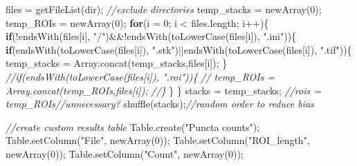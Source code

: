 \documentclass[
  12pt,
  a4paper,
]{book}
\newenvironment{Shaded}{}{}
\newcommand{\CommentTok}[1]{\textcolor[rgb]{0.38,0.63,0.69}{\textit{#1}}}
\newcommand{\ControlFlowTok}[1]{\textcolor[rgb]{0.00,0.44,0.13}{\textbf{#1}}}
\newcommand{\DecValTok}[1]{\textcolor[rgb]{0.25,0.63,0.44}{#1}}
\newcommand{\NormalTok}[1]{#1}
\newcommand{\OperatorTok}[1]{\textcolor[rgb]{0.40,0.40,0.40}{#1}}
\newcommand{\StringTok}[1]{\textcolor[rgb]{0.25,0.44,0.63}{#1}}
\begin{document}
\begin{Shaded}
\begin{Highlighting}[]
\NormalTok{files }\OperatorTok{=}\NormalTok{ getFileList}\OperatorTok{(}\NormalTok{dir}\OperatorTok{);}
\CommentTok{//exclude directories}
\NormalTok{temp\_stacks }\OperatorTok{=}\NormalTok{ newArray}\OperatorTok{(}\DecValTok{0}\OperatorTok{);}
\NormalTok{temp\_ROIs }\OperatorTok{=}\NormalTok{ newArray}\OperatorTok{(}\DecValTok{0}\OperatorTok{);}
\ControlFlowTok{for}\OperatorTok{(}\NormalTok{i }\OperatorTok{=} \DecValTok{0}\OperatorTok{;}\NormalTok{ i }\OperatorTok{\textless{}}\NormalTok{ files}\OperatorTok{.}\NormalTok{length}\OperatorTok{;}\NormalTok{ i}\OperatorTok{++)\{}
    \ControlFlowTok{if}\OperatorTok{(!}\NormalTok{endsWith}\OperatorTok{(}\NormalTok{files}\OperatorTok{[}\NormalTok{i}\OperatorTok{],} \StringTok{"/"}\OperatorTok{)\&\&!}\NormalTok{endsWith}\OperatorTok{(}\NormalTok{toLowerCase}\OperatorTok{(}\NormalTok{files}\OperatorTok{[}\NormalTok{i}\OperatorTok{]),} \StringTok{".ini"}\OperatorTok{))\{}
        \ControlFlowTok{if}\OperatorTok{(}\NormalTok{endsWith}\OperatorTok{(}\NormalTok{toLowerCase}\OperatorTok{(}\NormalTok{files}\OperatorTok{[}\NormalTok{i}\OperatorTok{]),} \StringTok{".stk"}\OperatorTok{)||}\NormalTok{endsWith}\OperatorTok{(}\NormalTok{toLowerCase}\OperatorTok{(}\NormalTok{files}\OperatorTok{[}\NormalTok{i}\OperatorTok{]),} \StringTok{".tif"}\OperatorTok{))\{}
\NormalTok{            temp\_stacks }\OperatorTok{=}\NormalTok{ Array}\OperatorTok{.}\NormalTok{concat}\OperatorTok{(}\NormalTok{temp\_stacks}\OperatorTok{,}\NormalTok{files}\OperatorTok{[}\NormalTok{i}\OperatorTok{]);}
        \OperatorTok{\}}
        \CommentTok{//if(endsWith(toLowerCase(files[i]), ".roi"))\{}
        \CommentTok{//  temp\_ROIs = Array.concat(temp\_ROIs,files[i]);}
        \CommentTok{//\}}
    \OperatorTok{\}}
\OperatorTok{\}}
\NormalTok{stacks }\OperatorTok{=}\NormalTok{ temp\_stacks}\OperatorTok{;}
\CommentTok{//rois = temp\_ROIs//unnecessary?}
\NormalTok{shuffle}\OperatorTok{(}\NormalTok{stacks}\OperatorTok{);}\CommentTok{//random order to reduce bias}

\CommentTok{//create custom results table}
\NormalTok{Table}\OperatorTok{.}\NormalTok{create}\OperatorTok{(}\StringTok{"Puncta counts"}\OperatorTok{);}
\NormalTok{Table}\OperatorTok{.}\NormalTok{setColumn}\OperatorTok{(}\StringTok{"File"}\OperatorTok{,}\NormalTok{ newArray}\OperatorTok{(}\DecValTok{0}\OperatorTok{));}
\NormalTok{Table}\OperatorTok{.}\NormalTok{setColumn}\OperatorTok{(}\StringTok{"ROI\_length"}\OperatorTok{,}\NormalTok{ newArray}\OperatorTok{(}\DecValTok{0}\OperatorTok{));}
\NormalTok{Table}\OperatorTok{.}\NormalTok{setColumn}\OperatorTok{(}\StringTok{"Count"}\OperatorTok{,}\NormalTok{ newArray}\OperatorTok{(}\DecValTok{0}\OperatorTok{));}
    

\end{Highlighting}
\end{Shaded}
\end{document}
